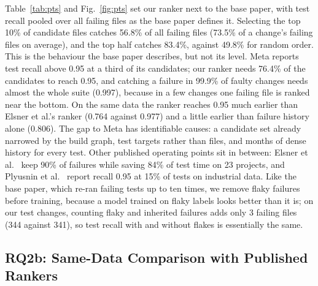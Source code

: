 \documentclass[10pt,conference]{IEEEtran}
\begin{document}
Table~\ref{tab:pts} and Fig.~\ref{fig:pts} set our ranker next to the base paper, with test recall pooled over all failing files as the base paper defines it. Selecting the top 10\% of candidate files catches 56.8\% of all failing files (73.5\% of a change's failing files on average), and the top half catches 83.4\%, against 49.8\% for random order. This is the behaviour the base paper describes, but not its level. Meta reports test recall above 0.95 at a third of its candidates; our ranker needs 76.4\% of the candidates to reach 0.95, and catching a failure in 99.9\% of faulty changes needs almost the whole suite (0.997), because in a few changes one failing file is ranked near the bottom. On the same data the ranker reaches 0.95 much earlier than Elsner et al.'s ranker (0.764 against 0.977) and a little earlier than failure history alone (0.806). The gap to Meta has identifiable causes: a candidate set already narrowed by the build graph, test targets rather than files, and months of dense history for every test. Other published operating points sit in between: Elsner et al.~\cite{elsner2021empirically} keep 90\% of failures while saving 84\% of test time on 23 projects, and Plyusnin et al.~\cite{plyusnin2025targeted} report recall 0.95 at 15\% of tests on industrial data. Like the base paper, which re-ran failing tests up to ten times, we remove flaky failures before training, because a model trained on flaky labels looks better than it is; on our test changes, counting flaky and inherited failures adds only 3 failing files (344 against 341), so test recall with and without flakes is essentially the same.

\subsection{RQ2b: Same-Data Comparison with Published Rankers}
\label{sec:rq2}
\end{document}

